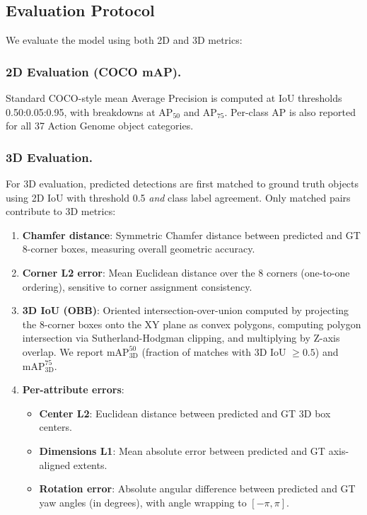 \documentclass[runningheads]{llncs}
\begin{document}
\subsection{Evaluation Protocol}
\label{sec:evaluation}

We evaluate the model using both 2D and 3D metrics:

\subsubsection{2D Evaluation (COCO mAP).}
Standard COCO-style mean Average Precision is computed at IoU thresholds 0.50:0.05:0.95, with breakdowns at AP$_{50}$ and AP$_{75}$.
Per-class AP is also reported for all 37 Action Genome object categories.

\subsubsection{3D Evaluation.}
For 3D evaluation, predicted detections are first matched to ground truth objects using 2D IoU with threshold 0.5 \emph{and} class label agreement.
Only matched pairs contribute to 3D metrics:

\begin{enumerate}
    \item \textbf{Chamfer distance}: Symmetric Chamfer distance between predicted and GT 8-corner boxes, measuring overall geometric accuracy.
    
    \item \textbf{Corner L2 error}: Mean Euclidean distance over the 8 corners (one-to-one ordering), sensitive to corner assignment consistency.
    
    \item \textbf{3D IoU (OBB)}: Oriented intersection-over-union computed by projecting the 8-corner boxes onto the XY plane as convex polygons, computing polygon intersection via Sutherland-Hodgman clipping, and multiplying by Z-axis overlap.  We report $\text{mAP}_{\text{3D}}^{50}$ (fraction of matches with 3D IoU $\geq 0.5$) and $\text{mAP}_{\text{3D}}^{75}$.
    
    \item \textbf{Per-attribute errors}:
    \begin{itemize}
        \item \textbf{Center L2}: Euclidean distance between predicted and GT 3D box centers.
        \item \textbf{Dimensions L1}: Mean absolute error between predicted and GT axis-aligned extents.
        \item \textbf{Rotation error}: Absolute angular difference between predicted and GT yaw angles (in degrees), with angle wrapping to $[-\pi, \pi]$.
    \end{itemize}
\end{enumerate}
\end{document}
